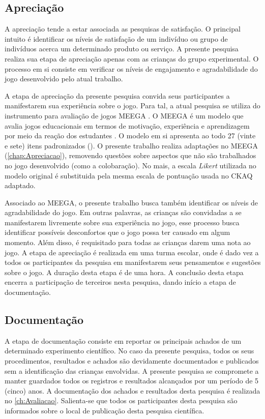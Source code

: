 \subsection{Apreciação}\label{subsec:grupo}

A apreciação tende a estar associada as pesquisas de satisfação. O principal intuito é identificar os níveis de satisfação de um indivíduo ou grupo de indivíduos acerca um determinado produto ou serviço. A presente pesquisa realiza sua etapa de apreciação apenas com as crianças do grupo experimental. O processo em si consiste em verificar os níveis de engajamento e agradabilidade do jogo desenvolvido pelo atual trabalho.  

A etapa de apreciação da presente pesquisa convida seus participantes a manifestarem sua experiência sobre o jogo. Para tal, a atual pesquisa se utiliza do instrumento para avaliação de jogos \ac{MEEGA} \cite{savi2011avaliacao}. O \ac{MEEGA} é um modelo que avalia jogos educacionais em termos de motivação, experiência e aprendizagem por meio da reação dos estudantes \cite{petri2019meega+}. O modelo em si apresenta ao todo 27 (vinte e sete) itens padronizados (). O presente trabalho realiza adaptações no \ac{MEEGA} (\autoref{chap:Apreciacao}), removendo questões sobre aspectos que não são trabalhados no jogo desenvolvido (como a colobaração). No mais, a escala \textit{Likert} utilizada no modelo original é substituida pela mesma escala de pontuação usada no \ac{CKAQ} adaptado.

Associado ao \ac{MEEGA}, o presente trabalho busca também identificar os níveis de agradabilidade do jogo. Em outras palavras, as crianças são convidadas a se manifestarem livremente sobre sua experiência no jogo, esse processo busca identificar possíveis desconfortos que o jogo possa ter causado em algum momento. Além disso, é requisitado para todas as crianças darem uma nota ao jogo. A etapa de apreciação é realizada em uma turma escolar, onde é dado vez a todos os participantes da pesquisa em manifestarem seus pensamentos e sugestões sobre o jogo. A duração desta etapa é de uma hora. A conclusão desta etapa encerra a participação de terceiros nesta pesquisa, dando início a etapa de documentação. 

\subsection{Documentação}\label{subsec:documentacao}

A etapa de documentação consiste em reportar os principais achados de um determinado experimento científico. No caso da presente pesquisa, todos os seus procedimentos, resultados e achados são devidamente documentados e publicados sem a identificação das crianças envolvidas. A presente pesquisa se compromete a manter guardados todos os registros e resultados alcançados por um período de 5 (cinco) anos. A documentação dos achados e resultados desta pesquisa é realizada no \autoref{ch:Avaliacao}. Salienta-se que todos os participantes desta pesquisa são informados sobre o local de publicação desta pesquisa científica. 

